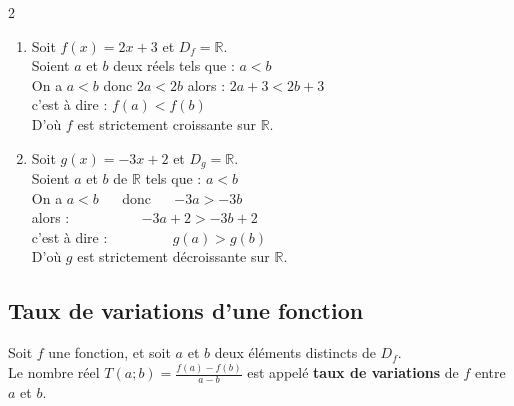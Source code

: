 \begin{Exemple}[][10 min]
\begin{multicols}{2}
\begin{enumerate}
    \item Soit $f(x) = 2x + 3$ et $D_f = \mathbb{R}$. 
    \vspace{0.1cm} \\
    Soient $a$ et $b$ deux réels tels que : $a < b$ \\
    On a $a < b$ donc $2a < 2b$ alors : $2a + 3 < 2b + 3$ \\
    c'est à dire : $f(a) < f(b)$ 
    \vspace{0.1cm} \\
    D'où $f$ est strictement croissante sur $\mathbb{R}$.

\columnbreak

    \item Soit $g(x) = -3x + 2$ et $D_g = \mathbb{R}$. 
    \vspace{0.1cm} \\
    Soient $a$ et $b$ de $\mathbb{R}$ tels que : $a < b$ \\
    On a $a < b$  ~~ donc ~~ $-3a > -3b$ \\
    alors : \qquad ~~~~~~~~~ $-3a + 2 > -3b + 2$ \\
    c'est à dire : \quad ~~~~~~~~ $g(a) > g(b)$ \vspace{0.1cm} \\
    D'où $g$ est strictement décroissante sur $\mathbb{R}$.
\end{enumerate}    
\end{multicols}
\end{Exemple}








\subsection{Taux de variations d'une fonction }

\begin{Definition}[hi][]
Soit $f$ une fonction, et soit $a$ et $b$ deux éléments distincts de $D_f$. \\
Le nombre réel $T(a;b) = \frac{f(a)-f(b)}{a-b}$ est appelé \textbf{taux de variations} de $f$ entre $a$ et $b$.
\end{Definition}

